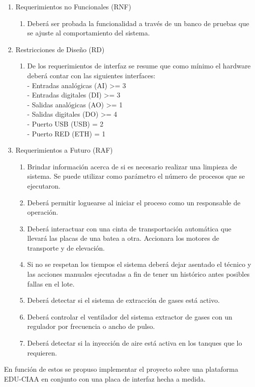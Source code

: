 \begin{enumerate}
\begin{enumerate}
\end{enumerate}

\item Requerimientos no Funcionales (RNF)
\begin{enumerate}
\item Deberá ser probada la funcionalidad a través de un banco de pruebas que se ajuste al comportamiento del sistema.
\end{enumerate}
\item Restricciones de Diseño (RD)
\begin{enumerate}
\item De los requerimientos de interfaz se resume que como mínimo el hardware deberá contar con las siguientes interfaces:\\
- Entradas analógicas (AI) >= 3	\\
- Entradas digitales (DI) >= 3	\\
- Salidas analógicas (AO) >= 1	\\
- Salidas digitales (DO) >= 4	\\
- Puerto USB (USB) = 2	\\
- Puerto RED (ETH) = 1	\\
\end{enumerate}
\item Requerimientos a Futuro (RAF)
\begin{enumerate}
\item Brindar información acerca de si es necesario realizar una limpieza de sistema. Se puede utilizar como parámetro el número de procesos que se ejecutaron. 	 	 	
\item Deberá permitir loguearse al iniciar el proceso como un responsable de operación.
\item Deberá interactuar con una cinta de transportación automática que llevará las placas de una batea a otra. Accionara los motores de transporte y de elevación.
\item Si no se respetan los tiempos el sistema deberá dejar asentado el técnico y las acciones manuales ejecutadas a fin de tener un histórico antes posibles fallas en el lote.
\item Deberá detectar si el sistema de extracción de gases está activo.
\item Deberá controlar el ventilador del sistema extractor de gases con un regulador por frecuencia o ancho de pulso.
\item Deberá detectar si la inyección de aire está activa en los tanques que lo requieren.
\end{enumerate}
\end{enumerate}


En función de estos se propuso implementar el proyecto sobre una plataforma EDU-CIAA \citep{CIAA} en conjunto con una placa de interfaz hecha a medida. 












